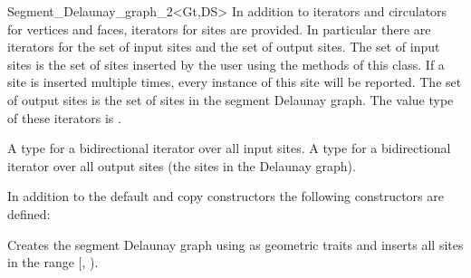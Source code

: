 \begin{ccRefClass}{Segment_Delaunay_graph_2<Gt,DS>}
In addition to iterators and circulators for vertices and faces,
iterators for sites are provided. In particular there are iterators
for the set of input sites and the set of output sites. The set of
input sites is the set of sites inserted by the user using the
 methods of this class. If a site is inserted multiple
times, every instance of this site will be reported. The set of output
sites is the set of sites in the segment Delaunay graph. The value
type of these iterators is .

{}
{A type for a bidirectional iterator over all input sites.}
\ccGlue
{}
{A type for a bidirectional iterator over all output sites (the sites
  in the Delaunay graph).}


\ccCreation
{}
\ccThreeToTwo
%

In addition to the default and copy constructors the following
constructors are defined:

%
{Creates the segment Delaunay graph using  as geometric traits
  and inserts all sites in the range [, ).
}
%





\end{ccRefClass}
